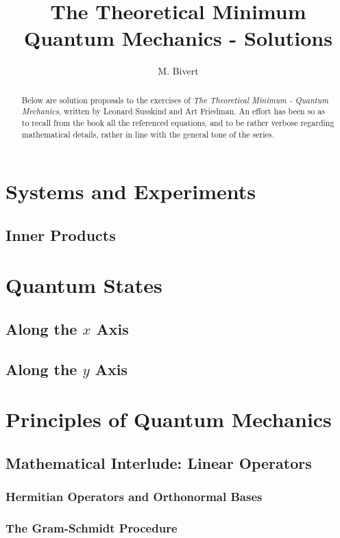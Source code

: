 \documentclass[a4paper]{article}
\author{M. Bivert}
\title{The Theoretical Minimum \\
	{\Large Quantum Mechanics - Solutions}
}
\begin{document}
\maketitle
\begin{abstract}
Below are solution proposals to the exercises of
\textit{The Theoretical Minimum - Quantum Mechanics}, written
by Leonard Susskind and Art Friedman. An effort has been
so as to recall from the book all the referenced equations,
and to be rather verbose regarding mathematical details, rather
in line with the general tone of the series.
\end{abstract}

\tableofcontents

\section{Systems and Experiments}
\subsection{Inner Products}


\section{Quantum States}
\subsection{Along the $x$ Axis}

\subsection{Along the $y$ Axis}


\section{Principles of Quantum Mechanics}
\subsection{Mathematical Interlude: Linear Operators}
\subsubsection{Hermitian Operators and Orthonormal Bases}

\subsubsection{The Gram-Schmidt Procedure}
\end{document}
